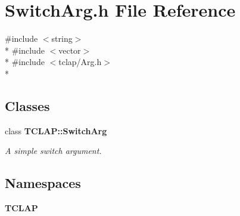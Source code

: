 \section{Switch\+Arg.\+h File Reference}
\label{SwitchArg_8h}
{\ttfamily \#include $<$string$>$}\\*
{\ttfamily \#include $<$vector$>$}\\*
{\ttfamily \#include $<$tclap/\+Arg.\+h$>$}\\*
\subsection*{Classes}
\begin{DoxyCompactItemize}
\item 
class {\bf T\+C\+L\+A\+P\+::\+Switch\+Arg}
\begin{DoxyCompactList}\small\item\em A simple switch argument. \end{DoxyCompactList}\end{DoxyCompactItemize}
\subsection*{Namespaces}
\begin{DoxyCompactItemize}
\item 
 {\bf T\+C\+L\+A\+P}
\end{DoxyCompactItemize}
